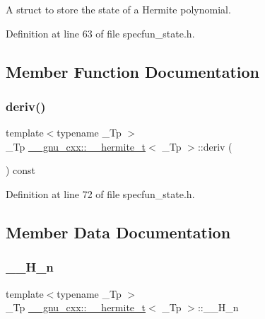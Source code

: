 A struct to store the state of a Hermite polynomial. 

Definition at line 63 of file specfun\+\_\+state.\+h.



\subsection{Member Function Documentation}
\mbox{\label{struct____gnu__cxx_1_1____hermite__t_aa92fd4096ca98fedad08b95187bb7a34}} 
\subsubsection{\texorpdfstring{deriv()}{deriv()}}
{\footnotesize\ttfamily template$<$typename \+\_\+\+Tp $>$ \\
\+\_\+\+Tp \hyperlink{struct____gnu__cxx_1_1____hermite__t}{\+\_\+\+\_\+gnu\+\_\+cxx\+::\+\_\+\+\_\+hermite\+\_\+t}$<$ \+\_\+\+Tp $>$\+::deriv (\begin{DoxyParamCaption}{ }\end{DoxyParamCaption}) const\hspace{0.3cm}{\ttfamily [inline]}}



Definition at line 72 of file specfun\+\_\+state.\+h.



\subsection{Member Data Documentation}
\mbox{\label{struct____gnu__cxx_1_1____hermite__t_a98a85357be4cb36000df3e552c197408}} 
\subsubsection{\texorpdfstring{\+\_\+\+\_\+\+H\+\_\+n}{\_\_H\_n}}
{\footnotesize\ttfamily template$<$typename \+\_\+\+Tp $>$ \\
\+\_\+\+Tp \hyperlink{struct____gnu__cxx_1_1____hermite__t}{\+\_\+\+\_\+gnu\+\_\+cxx\+::\+\_\+\+\_\+hermite\+\_\+t}$<$ \+\_\+\+Tp $>$\+::\+\_\+\+\_\+\+H\+\_\+n}



